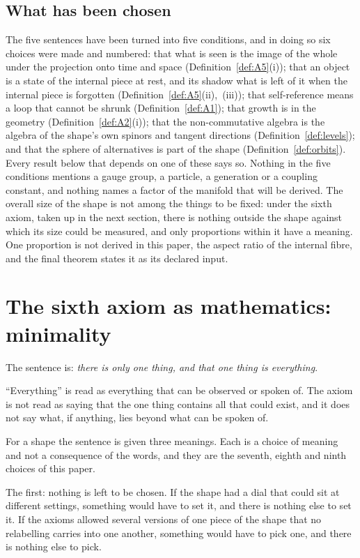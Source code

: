 \documentclass[11pt,a4paper]{article}
\theoremstyle{plain}
\theoremstyle{definition}
\theoremstyle{remark}
\begin{document}
\subsection{What has been chosen}\label{sec:scope}

The five sentences have been turned into five conditions, and in doing so six choices were made and numbered: that what is seen is the image of the whole under the projection onto time and space (Definition~\ref{def:A5}(i)); that an object is a state of the internal piece at rest, and its shadow what is left of it when the internal piece is forgotten (Definition~\ref{def:A5}(ii),~(iii)); that self-reference means a loop that cannot be shrunk (Definition~\ref{def:A1}); that growth is in the geometry (Definition~\ref{def:A2}(i)); that the non-commutative algebra is the algebra of the shape's own spinors and tangent directions (Definition~\ref{def:levels}); and that the sphere of alternatives is part of the shape (Definition~\ref{def:orbits}). Every result below that depends on one of these says so. Nothing in the five conditions mentions a gauge group, a particle, a generation or a coupling constant, and nothing names a factor of the manifold that will be derived. The overall size of the shape is not among the things to be fixed: under the sixth axiom, taken up in the next section, there is nothing outside the shape against which its size could be measured, and only proportions within it have a meaning. One proportion is not derived in this paper, the aspect ratio of the internal fibre, and the final theorem states it as its declared input.

\section{The sixth axiom as mathematics: minimality}\label{sec:minimal}

The sentence is: \emph{there is only one thing, and that one thing is everything}.

``Everything'' is read as everything that can be observed or spoken of. The axiom is not read as saying that the one thing contains all that could exist, and it does not say what, if anything, lies beyond what can be spoken of.

For a shape the sentence is given three meanings. Each is a choice of meaning and not a consequence of the words, and they are the seventh, eighth and ninth choices of this paper.

The first: nothing is left to be chosen. If the shape had a dial that could sit at different settings, something would have to set it, and there is nothing else to set it. If the axioms allowed several versions of one piece of the shape that no relabelling carries into one another, something would have to pick one, and there is nothing else to pick.
\end{document}

